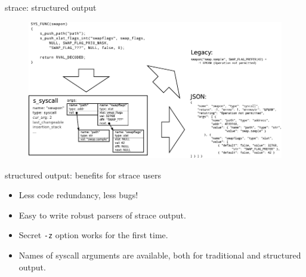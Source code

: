 \documentclass[pdf]{beamer}
\begin{document}
\begin{frame}{strace: structured output}
\begin{figure}[h]
      \includegraphics[width=\textwidth]{lp0-structured}
\end{figure}
\end{frame}

\begin{frame}{structured output: benefits for strace users}
\begin{itemize}
\item Less code redundancy, less bugs!
\item Easy to write robust parsers of strace output.
\item Secret \texttt{-z} option works for the first time.
\item Names of syscall arguments are available, both for traditional and structured output.
\end{itemize}
\end{frame}
\end{document}
